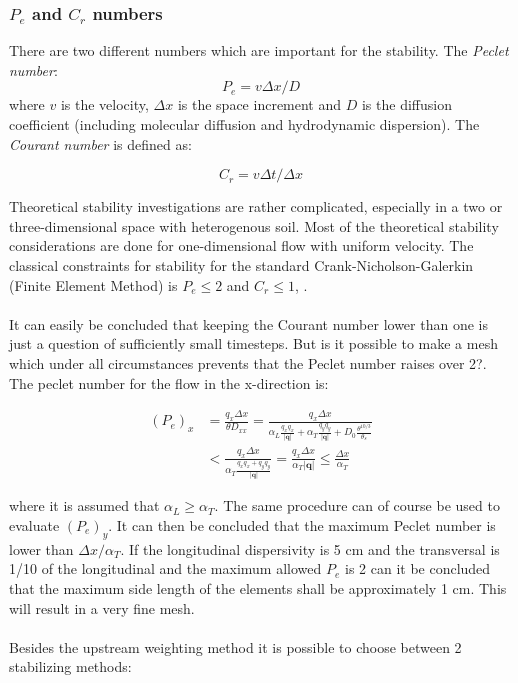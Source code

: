 \documentclass{report}
\begin{document}
\subsubsection{$P_e$ and $C_r$ numbers}

There are two different numbers which are important for the
stability. The \textit{Peclet number}:
%
\begin{equation}
P_e=v\Delta x/D
\label{eq:Peclet}
\end{equation}
%
where $v$ is the velocity, $\Delta x$ is the
 space increment and $D$ is the diffusion coefficient (including
molecular diffusion and hydrodynamic dispersion). The
\textit{Courant number} is defined as:

\begin{equation}
C_r=v\Delta t/\Delta x
\label{eq:Courant}
\end{equation}

Theoretical stability investigations are rather complicated, especially
in a two or three-dimensional space with heterogenous soil. Most of
the theoretical stability considerations are done for one-dimensional
flow with uniform velocity. The classical constraints for stability for
the standard Crank-Nicholson-Galerkin (Finite Element Method) is
$P_e\leq 2$ and $C_r \leq 1$, \cite{Perrochet}.\\
\\
It can easily be concluded that keeping the Courant number lower
than one is just a question of sufficiently small timesteps. But is it
possible to make a mesh which under all circumstances prevents
that the Peclet number raises over 2?. The peclet number for the
flow in the x-direction is:

\begin{equation}
\begin{split}
(P_e)_x&=\frac{q_x \Delta x}{\theta D_{xx}}=\frac{q_x \Delta x}{\alpha_L
  \frac{q_xq_x}{|\mathbf{q}|}+\alpha_T\frac{q_yq_y}{|\mathbf{q}|}+D_0\frac{\theta^{10/3}}{\theta_s}}\\
& <\frac{q_x \Delta x}{\alpha_T\frac{q_xq_x+q_yq_y}{|\mathbf{q}|}}
  = \frac{q_x \Delta x}{\alpha_T |\mathbf{q}|} \leq \frac{\Delta x}{\alpha_T}
\end{split}
\end{equation}

where it is assumed that $\alpha_L \geq  \alpha_T$. The same
procedure can of course be used to evaluate $(P_e)_y$. It can then
be concluded that the maximum Peclet number is lower than
$\Delta x /\alpha_T$. If the longitudinal dispersivity is 5 cm and the
transversal is 1/10 of the longitudinal and the maximum allowed
$P_e$ is 2 can it be concluded that the maximum side length of the
elements shall be approximately 1 cm. This will result in a very fine
mesh.\\
\\
Besides the upstream weighting method it is possible to choose
between 2 stabilizing methods:
\end{document}
